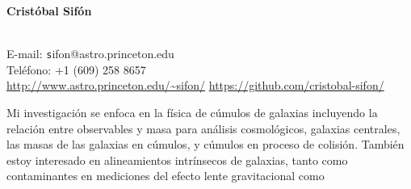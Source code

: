 \documentclass[11pt]{article}
\begin{document}
\begin{minipage}[b]{0.46\linewidth}
\flushleft
\hspace{-0.7cm}
{\bf\huge Crist\'obal Sif\'on}\\\vspace{0.2cm}
\\
\end{minipage}
\begin{minipage}[b]{0.49\linewidth}
\flushright
{\large E-mail: {\texttt sifon@astro.princeton.edu}\\
        Tel\'efono: +1 (609) 258 8657\\
        \url{http://www.astro.princeton.edu/~sifon/}
        \url{https://github.com/cristobal-sifon/}}
\end{minipage}
\vspace{0.4cm}
\hline





Mi investigaci\'on se enfoca en la f\'isica de c\'umulos de galaxias incluyendo la relaci\'on entre observables y masa para an\'alisis cosmol\'ogicos, galaxias centrales, las masas de las galaxias en c\'umulos, y c\'umulos en proceso de colisi\'on. Tambi\'en estoy interesado en alineamientos intr\'insecos de galaxias, tanto como contaminantes en mediciones del efecto lente gravitacional como 
\end{document}
